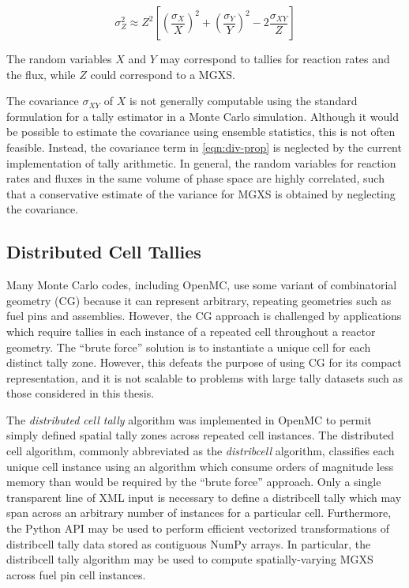 \begin{equation}
\label{eqn:div-prop}
\sigma_{Z}^{2} \approx Z^{2}\left[\left(\frac{\sigma_{X}}{X}\right)^{2} + \left(\frac{\sigma_{Y}}{Y}\right)^{2} - 2\frac{\sigma_{XY}}{Z}\right]
\end{equation}

\noindent The random variables $X$ and $Y$ may correspond to tallies for reaction rates and the flux, while $Z$ could correspond to a MGXS.

The covariance $\sigma_{XY}$ of $X$ is not generally computable using the standard formulation for a tally estimator in a Monte Carlo simulation. Although it would be possible to estimate the covariance using ensemble statistics, this is not often feasible. Instead, the covariance term in \autoref{eqn:div-prop} is neglected by the current implementation of tally arithmetic. In general, the random variables for reaction rates and fluxes in the same volume of phase space are highly correlated, such that a conservative estimate of the variance for MGXS is obtained by neglecting the covariance.

\subsection{Distributed Cell Tallies}
\label{subsec:distribcells}

Many Monte Carlo codes, including OpenMC, use some variant of combinatorial geometry (CG) because it can represent arbitrary, repeating geometries such as fuel pins and assemblies. However, the CG approach is challenged by applications which require tallies in each instance of a repeated cell throughout a reactor geometry. The ``brute force'' solution is to instantiate a unique cell for each distinct tally zone. However, this defeats the purpose of using CG for its compact representation, and it is not scalable to problems with large tally datasets such as those considered in this thesis.

The \textit{distributed cell tally} algorithm was implemented in OpenMC \cite{lax2014distribcell} to permit simply defined spatial tally zones across repeated cell instances. The distributed cell algorithm, commonly abbreviated as the \textit{distribcell} algorithm, classifies each unique cell instance using an algorithm which consume orders of magnitude less memory than would be required by the ``brute force'' approach. Only a single transparent line of XML input is necessary to define a distribcell tally which may span across an arbitrary number of instances for a particular cell. Furthermore, the Python API may be used to perform efficient vectorized transformations of distribcell tally data stored as contiguous NumPy arrays. In particular, the distribcell tally algorithm may be used to compute spatially-varying MGXS across fuel pin cell instances.

